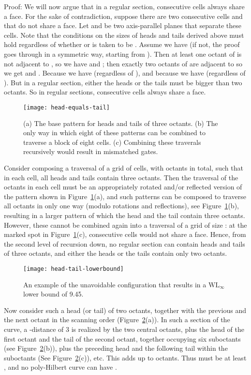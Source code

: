 \documentclass[11pt,a4paper]{article}
\def\WLMax{\ensuremath{\mathrm{WL}_\infty}\xspace}
\newenvironment{proof}{Proof:}{\qed}
\def\squareforqed{\hbox{\rlap{}}}
\def\qed{\ifmmode\squareforqed\else{\unskip\nobreak\hfil
\penalty50\hskip1em\null\nobreak\hfil\squareforqed
\parfillskip=0pt\finalhyphendemerits=0\endgraf}\fi}
\begin{document}
\begin{proof}
We will now argue that in a regular section, consecutive cells always share a face. For the sake of contradiction, suppose there are two consecutive cells  and  that do not share a face. Let  and  be two axis-parallel planes that separate these cells. Note that the conditions on the sizes of heads and tails derived above must hold regardless of whether  or  is taken to be . Assume we have  (if not, the proof goes through in a symmetric way, starting from ). Then at least one octant of  is not adjacent to , so we have  and ; then exactly two octants of  are adjacent to  so we get  and . Because  we have  (regardless of ), and because  we have  (regardless of ). But in a regular section, either the heads or the tails must be bigger than two octants. So in regular sections, consecutive cells always share a face.

\begin{figure}
\centering
\texttt{[image: head-equals-tail]}
\caption{(a) The base pattern for heads and tails of three octants.\quad
(b) The only way in which eight of these patterns can be combined to traverse a block of eight cells.\quad
(c) Combining these traverals recursively would result in mismatched gates.}
\label{fig:WLMaxlbd2}
\end{figure}

Consider composing a traversal of a grid of  cells, with  octants in total, such that in each cell, all heads and tails contain three octants. Then the traversal of the octants in each cell must be an appropriately rotated and/or reflected version of the pattern shown in Figure~\ref{fig:WLMaxlbd2}(a), and such patterns can be composed to traverse all  octants in only one way (modulo rotations and reflections), see Figure~\ref{fig:WLMaxlbd2}(b), resulting in a larger pattern of which the head and the tail contain three octants. However, these cannot be combined again into a traversal of a grid of size : at the marked spot in Figure~\ref{fig:WLMaxlbd2}(c), consecutive cells would not share a face. Hence, from the second level of recursion down, no regular section can contain heads and tails of three octants, and either the heads or the tails contain only two octants.

\begin{figure}
\centering
\texttt{[image: head-tail-lowerbound]}
\caption{An example of the unavoidable configuration that results in a \WLMax lower bound of 9.45.}
\label{fig:WLMaxlbd3}
\end{figure}

Now consider such a head (or tail) of two octants, together with the previous and the next octant in the scanning order (Figure~\ref{fig:WLMaxlbd3}(a)). In such a section of the curve, a -distance of 3 is realized by the two central octants, plus the head of the first octant and the tail of the second octant, together occupying six suboctants (see Figure~\ref{fig:WLMaxlbd3}(b)), plus the preceding head and the following tail within the suboctants (See Figure~\ref{fig:WLMaxlbd3}(c)), etc. This adds up to  octants. Thus  must be at least , and no poly-Hilbert curve can have .
\end{proof}
\end{document}
